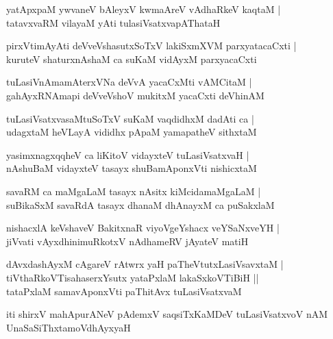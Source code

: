 \documentclass[twoside,12pt,openright]{book}
\newcounter{shloka}[chapter]
\begin{document}
\begin{shloka}%
yatApxpaM ywvaneV bAleyxV kwmaAreV vAdhaRkeV kaqtaM |\\
tatavxvaRM vilayaM yAti tulasiVsatxvapAThataH 
\end{shloka}

\begin{shloka}%
pirxVtimAyAti deVveVshasutxSoTxV lakiSxmXVM parxyatacaCxti |\\
kuruteV shaturxnAshaM ca suKaM vidAyxM parxyacaCxti 
\end{shloka}

\begin{shloka}%
tuLasiVnAmamAterxVNa deVvA yacaCxMti vAMCitaM |\\
gahAyxRNAmapi deVveVshoV mukitxM yacaCxti deVhinAM 
\end{shloka}

\begin{shloka}%
tuLasiVsatxvasaMtuSoTxV suKaM vaqdidhxM dadAti ca |\\
udagxtaM heVLayA vididhx pApaM yamapatheV sithxtaM 
\end{shloka}

\begin{shloka}%
yasimxnagxqqheV ca liKitoV vidayxteV tuLasiVsatxvaH |\\
nAshuBaM vidayxteV tasayx shuBamAponxVti nishicxtaM 
\end{shloka}

\begin{shloka}%
savaRM ca maMgaLaM tasayx nAsitx kiMcidamaMgaLaM |\\
suBikaSxM savaRdA tasayx dhanaM dhAnayxM ca puSakxlaM 
\end{shloka}

\begin{shloka}%
nishacxlA keVshaveV BakitxnaR viyoVgeYshacx veYSaNxveYH |\\
jiVvati vAyxdhinimuRkotxV nAdhameRV jAyateV matiH 
\end{shloka}

\begin{shloka}%
dAvxdashAyxM cAgareV rAtwrx yaH paTheVtutxLasiVsavxtaM |\\
tiVthaRkoVTisahaserxYsutx yataPxlaM lakaSxkoVTiBiH ||\\
tataPxlaM samavAponxVti paThitAvx tuLasiVsatxvaM 
\end{shloka}

\begin{center}
iti shirxV mahApurANeV pAdemxV saqsiTxKaMDeV tuLasiVsatxvoV nAM UnaSaSiThxtamoVdhAyxyaH
\end{center}
\end{document}
